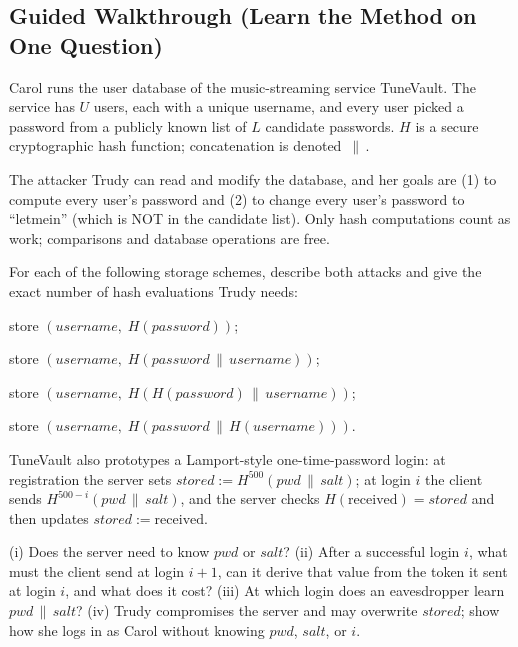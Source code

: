 \documentclass[12pt, a4paper]{article}
\begin{document}
\subsection*{Guided Walkthrough (Learn the Method on One Question)}

\begin{problembox}
Carol runs the user database of the music-streaming service TuneVault. The service has $U$ users, each with a unique username, and every user picked a password from a publicly known list of $L$ candidate passwords. $H$ is a secure cryptographic hash function; concatenation is denoted $\,\|\,$.

The attacker Trudy can read and modify the database, and her goals are (1) to compute every user's password and (2) to change every user's password to ``letmein'' (which is NOT in the candidate list). Only hash computations count as work; comparisons and database operations are free.

For each of the following storage schemes, describe both attacks and give the exact number of hash evaluations Trudy needs:
\begin{tightitem}
\item[(a)] store $(username,\; H(password))$;
\item[(b)] store $(username,\; H(password \,\|\, username))$;
\item[(c)] store $(username,\; H(H(password) \,\|\, username))$;
\item[(d)] store $(username,\; H(password \,\|\, H(username)))$.
\end{tightitem}
TuneVault also prototypes a Lamport-style one-time-password login: at registration the server sets $stored := H^{500}(pwd \,\|\, salt)$; at login $i$ the client sends $H^{500-i}(pwd \,\|\, salt)$, and the server checks $H(\text{received}) = stored$ and then updates $stored := \text{received}$.

(i) Does the server need to know $pwd$ or $salt$? (ii) After a successful login $i$, what must the client send at login $i+1$, can it derive that value from the token it sent at login $i$, and what does it cost? (iii) At which login does an eavesdropper learn $pwd \,\|\, salt$? (iv) Trudy compromises the server and may overwrite $stored$; show how she logs in as Carol without knowing $pwd$, $salt$, or $i$.
\end{problembox}
\end{document}
